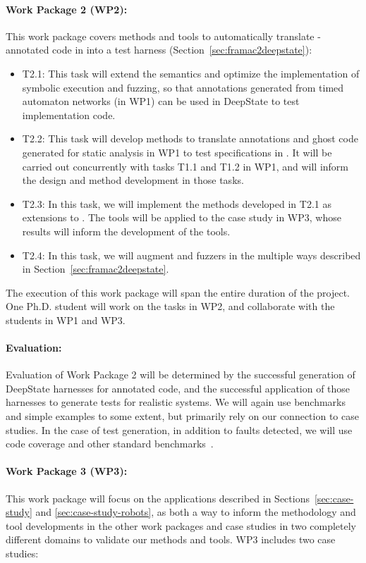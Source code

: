 \paragraph{Work Package 2 (WP2):}  This work package covers
methods and tools to automatically translate \acsl-annotated code in
\framac into a \deepstate test harness (Section~\ref{sec:framac2deepstate}):
\begin{itemize}[labelsep=3pt,leftmargin=12pt]
\item T2.1: This task will extend the \eacsl semantics and optimize the implementation of symbolic execution and fuzzing, so that \acsl annotations generated from timed automaton networks (in WP1) can be used in DeepState to test implementation code.
\item T2.2: This task will develop methods to translate annotations and ghost code generated for static analysis in WP1 to test specifications in \deepstate.  It will be carried out concurrently with tasks T1.1 and T1.2 in WP1, and will inform the design and method development in those tasks.
\item T2.3: In this task, we will implement the methods developed in
  T2.1 as extensions to \deepstate.  The tools will be applied to the
  case study in WP3, whose results will inform the development of the
  tools.
\item T2.4: In this task, we will augment \deepstate and fuzzers in the multiple ways described in Section~\ref{sec:framac2deepstate}.  
\end{itemize}

The execution of this work package will span the entire duration of the project.
One Ph.D. student will work on the tasks in WP2, and collaborate with
the students in WP1 and WP3.

\paragraph{Evaluation:} Evaluation of
Work Package 2 will be determined by the successful generation of
DeepState harnesses for \acsl annotated code, and the successful
application of those harnesses to generate tests for realistic
systems.  We will again use benchmarks and simple examples to some
extent, but primarily rely on our connection to case studies.
In the case of test generation, in addition to faults
detected, we will use code coverage and other standard benchmarks~\cite{FuzzerHicks}.


\paragraph{Work Package 3 (WP3):}  This work package will focus on the applications described in Sections~\ref{sec:case-study} and \ref{sec:case-study-robots}, as both a way to inform the methodology and tool developments in the other work packages and case studies in two completely different domains to validate our methods and tools.
WP3 includes two case studies:
